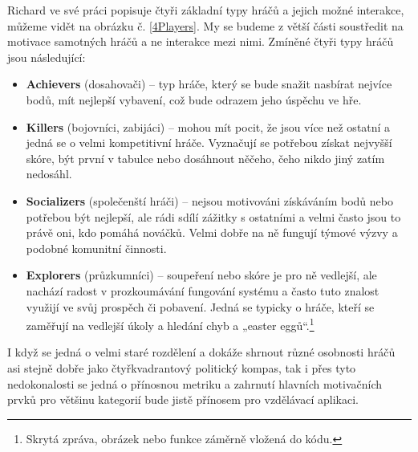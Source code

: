 \documentclass[twoside, 12pt]{article}
\begin{document}
Richard \textcite{Bartle} ve své práci popisuje čtyři základní typy hráčů a jejich možné interakce, můžeme vidět na obrázku č. \ref{4Players}. My se budeme z větší části soustředit na motivace samotných hráčů a ne interakce mezi nimi. Zmíněné čtyři typy hráčů jsou následující:

\begin{itemize}

\item \textbf{Achievers} (dosahovači) -- typ hráče, který se bude snažit nasbírat nejvíce bodů, mít nejlepší vybavení, což bude odrazem jeho úspěchu ve hře.

\item \textbf{Killers} (bojovníci, zabijáci) -- mohou mít pocit, že jsou více než ostatní a jedná se o velmi kompetitivní hráče. Vyznačují se potřebou získat nejvyšší skóre, být první v tabulce nebo dosáhnout něčeho, čeho nikdo jiný zatím nedosáhl.

\item \textbf{Socializers} (společenští hráči) -- nejsou motivováni získáváním bodů nebo potřebou být nejlepší, ale rádi sdílí zážitky s ostatními a velmi často jsou to právě oni, kdo pomáhá nováčků. Velmi dobře na ně fungují týmové výzvy a podobné komunitní činnosti.

\item \textbf{Explorers} (průzkumníci) -- soupeření nebo skóre je pro ně vedlejší, ale nachází radost v prozkoumávání fungování systému a často tuto znalost využijí ve svůj prospěch či pobavení. Jedná se typicky o hráče, kteří se zaměřují na vedlejší úkoly a hledání chyb a „easter eggů“.\footnote{Skrytá zpráva, obrázek nebo funkce záměrně vložená do kódu.}

\end{itemize}

\obrazek


I když se jedná o velmi staré rozdělení a dokáže shrnout různé osobnosti hráčů asi stejně dobře jako čtyřkvadrantový politický kompas, tak i přes tyto nedokonalosti se jedná o přínosnou metriku a zahrnutí hlavních motivačních prvků pro většinu kategorií bude jistě přínosem pro vzdělávací aplikaci.







\end{document}
